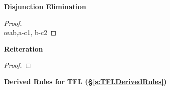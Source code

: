 \begin{multicols}{2}
\vspace{1em}\noindent\textbf{Disjunction Elimination}

\begin{proof}
\\	\open
		 
	\close
	\open
		 
	\close
	 \oe{ab,a-c1, b-c2}
\end{proof}

\vspace{1em}\noindent\textbf{Reiteration}

\begin{proof}
	 
\end{proof}


\end{multicols}

\vspace{1em}
\begin{center}
\textbf{\Large Derived Rules for TFL (\S \ref{s:TFLDerivedRules})}
\end{center}


